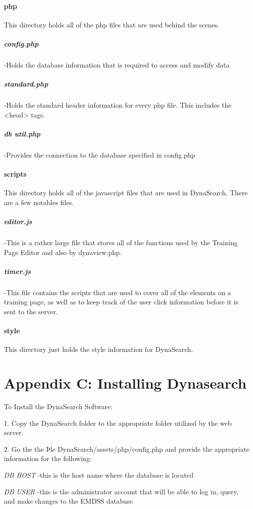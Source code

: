 \documentclass[article]{ij4uq}              %
\begin{document}
\paragraph{php}
This directory holds all of the php files that are used behind the scenes.

\subparagraph{config.php} -Holds the database information that is required to access and modify data 

\subparagraph{standard.php} -Holds the standard header information for every php file. This includes the <head> tags. 
	
\subparagraph{db util.php} -Provides the connection to the database specified in config.php

\paragraph{scripts}
This directory holds all of the javascript files that are used in DynaSearch. There are a few notables files. 

\subparagraph{editor.js} -This is a rather large file that stores all of the functions used by the Training Page Editor and also by dynaview.php.
 	
\subparagraph{timer.js} -This file contains the scripts that are used to cover all of the elements on a training page, as well as to keep track of the user click information before it is sent to the server.

\paragraph{style}
This directory just holds the style information for DynaSearch.

\section{Appendix C: Installing Dynasearch}
To Install the DynaSearch Software:

1. Copy the DynaSearch folder to the appropriate folder utilized by the web server. 

2. Go the the Þle DynaSearch/assets/php/config.php and provide the 
appropriate information for the following: 


\emph{DB HOST} -this is the host name where the database is located
	
\emph{DB USER} -this is the administrator account that will be able to log in, query, and make changes to the EMDSS database
	
\end{document}
